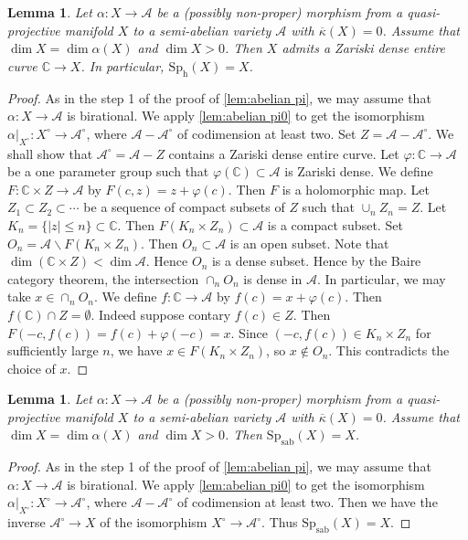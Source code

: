 \documentclass[11pt,english]{smfart}
\theoremstyle{plain}
\newtheorem{lem}[thm]{Lemma}
\theoremstyle{definition}
\theoremstyle{remark}
\numberwithin{equation}{section}
\theoremstyle{plain}
\newcommand{\cA}{\mathcal A}
\newcommand{\Spab}{\mathrm{Sp}_{\mathrm{sab}}}
\newcommand{\Sph}{\mathrm{Sp}_{\mathrm{h}}}
\begin{document}
\begin{lem}\label{lem:ZD}
	Let $\alpha:X\to \cA$ be  a  (possibly non-proper)  morphism  from a quasi-projective manifold $X$ to a semi-abelian variety $\cA$ with   $\overline{\kappa}(X)=0$. 
	Assume that $\dim X=\dim \alpha(X)$ and $\dim X>0$.
	Then $X$ admits a Zariski dense entire curve $\mathbb C\to X$. 
	In particular, $\Sph(X)=X$.
\end{lem}


\begin{proof} 
	As in the step 1 of the proof of \cref{lem:abelian pi}, we may assume that $\alpha:X\to \cA$ is birational.
	We apply \cref{lem:abelian pi0} to get the isomorphism $\alpha|_{X^{\circ}}:X^{\circ}\to \cA^{\circ}$, where $\cA-\cA^\circ$ of codimension at least two.
	Set $Z=\cA-\cA^{\circ}$.
	We shall show that $\cA^{\circ}=\cA-Z$ contains a Zariski dense entire curve.
	Let $\varphi:\mathbb C\to \cA$ be a one parameter group such that $\varphi(\mathbb C)\subset \cA$ is Zariski dense.
	We define $F:\mathbb C\times Z\to \cA$ by $F(c,z)=z+\varphi(c)$.
	Then $F$ is a holomorphic map.
	Let $Z_1\subset Z_2\subset \cdots$ be a sequence of compact subsets of $Z$ such that $\cup_nZ_n=Z$.
	Let $K_n=\{|z|\leq n\}\subset \mathbb C$.
	Then $F(K_n\times Z_n)\subset \cA$ is a compact subset.
	Set $O_n=\cA\backslash F(K_n\times Z_n)$.
	Then $O_n\subset \cA$ is an open subset.
	Note that $\dim (\mathbb C\times Z)<\dim \cA$.
	Hence $O_n$ is a dense subset.
	Hence by the Baire category theorem, the intersection $\cap_nO_n$ is dense in $\cA$.
	In particular, we may take $x\in \cap_nO_n$.
	We define $f:\mathbb C\to \cA$ by $f(c)=x+\varphi(c)$.
	Then $f(\mathbb C)\cap Z=\emptyset$.
	Indeed suppose contary $f(c)\in Z$.
	Then $F(-c,f(c))=f(c)+\varphi(-c)=x$.
	Since $(-c,f(c))\in K_n\times Z_n$ for sufficiently large $n$, we have $x\in F(K_n\times Z_n)$, so $x\not\in O_n$.
	This contradicts the choice of $x$.  
\end{proof}


\begin{lem}\label{lem:20230509} 
	Let $\alpha:X\to \cA$ be  a  (possibly non-proper)  morphism  from a quasi-projective manifold $X$ to a semi-abelian variety $\cA$ with   $\overline{\kappa}(X)=0$. 
	Assume that $\dim X=\dim \alpha(X)$ and $\dim X>0$.
	Then $\Spab(X)=X$.
\end{lem}

\begin{proof}
	As in the step 1 of the proof of \cref{lem:abelian pi}, we may assume that $\alpha:X\to \cA$ is birational.
	We apply \cref{lem:abelian pi0} to get the isomorphism $\alpha|_{X^{\circ}}:X^{\circ}\to \cA^{\circ}$, where $\cA-\cA^\circ$ of codimension at least two.
	Then we have the inverse $\cA^{\circ}\to X$ of the isomorphism $X^{\circ}\to \cA^{\circ}$.
	Thus $\Spab(X)=X$.
\end{proof}
 
\end{document}
